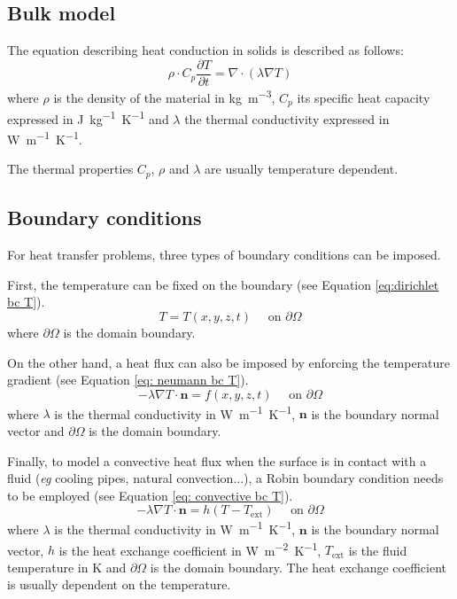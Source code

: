\subsection{Bulk model}

The equation describing heat conduction in solids is described as follows:
\begin{equation}
    \rho \cdot C_p \frac{\partial T}{\partial t}=\nabla \cdot (\lambda \nabla T)
    \label{eq:heat equation}
\end{equation}
where $\rho$ is the density of the material in \si{kg.m^{-3}}, $C_p$ its specific heat capacity expressed in \si{J.kg^{-1}.K^{-1}} and $\lambda$ the thermal conductivity expressed in \si{W.m^{-1}.K^{-1}}.

The thermal properties $C_p$, $\rho$ and $\lambda$ are usually temperature dependent.

\subsection{Boundary conditions}

For heat transfer problems, three types of boundary conditions can be imposed.

First, the temperature can be fixed on the boundary (see Equation \ref{eq:dirichlet bc T}).
\begin{equation}
    T = T(x, y, z, t) \quad \text { on } \partial \Omega
    \label{eq:dirichlet bc T}
\end{equation}
where $\partial \Omega$ is the domain boundary.

On the other hand, a heat flux can also be imposed by enforcing the temperature gradient (see Equation \ref{eq: neumann bc T}).
\begin{equation}
    -\lambda \nabla T \cdot \mathbf{n} = f(x, y, z, t) \quad \text { on } \partial \Omega
    \label{eq: neumann bc T}
\end{equation}
where $\lambda$ is the thermal conductivity in \si{W.m^{-1}.K^{-1}}, $\mathbf{n}$ is the boundary normal vector and $\partial \Omega$ is the domain boundary.

Finally, to model a convective heat flux when the surface is in contact with a fluid (\textit{eg} cooling pipes, natural convection...), a Robin boundary condition needs to be employed (see Equation \ref{eq: convective bc T}).
\begin{equation}
    -\lambda \nabla T \cdot \mathbf{n} = h (T - T_\mathrm{ext}) \quad \text { on } \partial \Omega
    \label{eq: convective bc T}
\end{equation}
where $\lambda$ is the thermal conductivity in \si{W.m^{-1}.K^{-1}}, $\mathbf{n}$ is the boundary normal vector, $h$ is the heat exchange coefficient in \si{W.m^{-2}.K^{-1}}, $T_\mathrm{ext}$ is the fluid temperature in \si{K} and $\partial \Omega$ is the domain boundary.
The heat exchange coefficient is usually dependent on the temperature.

